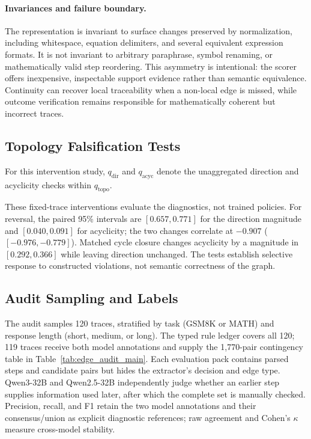 \paragraph{Invariances and failure boundary.}
The representation is invariant to surface changes preserved by normalization, including whitespace, equation delimiters, and several equivalent expression formats. It is not invariant to arbitrary paraphrase, symbol renaming, or mathematically valid step reordering. This asymmetry is intentional: the scorer offers inexpensive, inspectable support evidence rather than semantic equivalence. Continuity can recover local traceability when a non-local edge is missed, while outcome verification remains responsible for mathematically coherent but incorrect traces.

\subsection{Topology Falsification Tests}
\label{app:acyclicity_scope}
For this intervention study, $q_{\mathrm{dir}}$ and $q_{\mathrm{acyc}}$ denote the unaggregated direction and acyclicity checks within $q_{\mathrm{topo}}$.

These fixed-trace interventions evaluate the diagnostics, not trained policies. For reversal, the paired 95\% intervals are $[0.657,0.771]$ for the direction magnitude and $[0.040,0.091]$ for acyclicity; the two changes correlate at $-0.907$ ($[-0.976,-0.779]$). Matched cycle closure changes acyclicity by a magnitude in $[0.292,0.366]$ while leaving direction unchanged. The tests establish selective response to constructed violations, not semantic correctness of the graph.

\subsection{Audit Sampling and Labels}
The audit samples 120 traces, stratified by task (GSM8K or MATH) and response length (short, medium, or long). The typed rule ledger covers all 120; 119 traces receive both model annotations and supply the 1{,}770-pair contingency table in Table~\ref{tab:edge_audit_main}. Each evaluation pack contains parsed steps and candidate pairs but hides the extractor's decision and edge type. Qwen3-32B and Qwen2.5-32B independently judge whether an earlier step supplies information used later, after which the complete set is manually checked. Precision, recall, and F1 retain the two model annotations and their consensus/union as explicit diagnostic references; raw agreement and Cohen's $\kappa$ measure cross-model stability.

